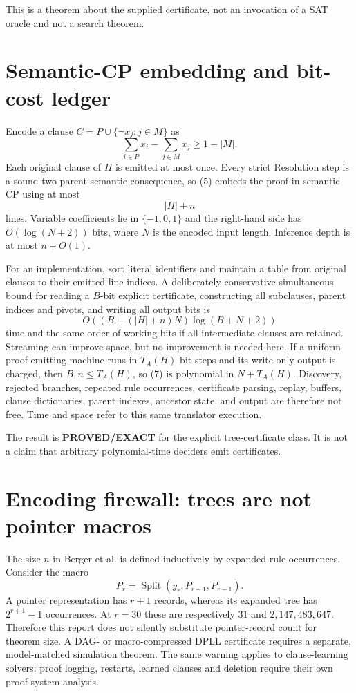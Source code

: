 \documentclass[11pt]{article}
\newcommand{\EXACT}{\textbf{PROVED/EXACT}}
\begin{document}
This is a theorem about the supplied certificate, not an invocation of a SAT
oracle and not a search theorem.

\section{Semantic-CP embedding and bit-cost ledger}
Encode a clause $C=P\cup\{\neg x_j:j\in M\}$ as
\[
             \sum_{i\in P}x_i-\sum_{j\in M}x_j
             \ge 1-|M|.                                  \tag{5}
\]
Each original clause of $H$ is emitted at most once.  Every strict Resolution
step is a sound two-parent semantic consequence, so (5) embeds the proof in
semantic CP using at most
\[
                        |H|+n                              \tag{6}
\]
lines.  Variable coefficients lie in $\{-1,0,1\}$ and the right-hand side
has $O(\log(N+2))$ bits, where $N$ is the encoded input length.  Inference
depth is at most $n+O(1)$.

For an implementation, sort literal identifiers and maintain a table from
original clauses to their emitted line indices.  A deliberately conservative
simultaneous bound for reading a $B$-bit explicit certificate, constructing
all subclauses, parent indices and pivots, and writing all output bits is
\[
 O\!\left((B+(|H|+n)N)\log(B+N+2)\right)                 \tag{7}
\]
time and the same order of working bits if all intermediate clauses are
retained.  Streaming can improve space, but no improvement is needed here.
If a uniform proof-emitting machine runs in $T_A(H)$ bit steps and its
write-only output is charged, then $B,n\le T_A(H)$, so (7) is polynomial in
$N+T_A(H)$.  Discovery, rejected branches, repeated rule occurrences,
certificate parsing, replay, buffers, clause dictionaries, parent indexes,
ancestor state, and output are therefore not free.  Time and space refer to
this same translator execution.

The result is \EXACT{} for the explicit tree-certificate class.  It is not a
claim that arbitrary polynomial-time deciders emit certificates.

\section{Encoding firewall: trees are not pointer macros}
The size $n$ in Berger et al. is defined inductively by expanded rule
occurrences.  Consider the macro
\[
        P_r=\operatorname{Split}(y_r,P_{r-1},P_{r-1}).    \tag{8}
\]
A pointer representation has $r+1$ records, whereas its expanded tree has
$2^{r+1}-1$ occurrences.  At $r=30$ these are respectively $31$ and
$2{,}147{,}483{,}647$.  Therefore this report does not silently substitute
pointer-record count for theorem size.  A DAG- or macro-compressed DPLL
certificate requires a separate, model-matched simulation theorem.  The
same warning applies to clause-learning solvers: proof logging, restarts,
learned clauses and deletion require their own proof-system analysis.
\end{document}

